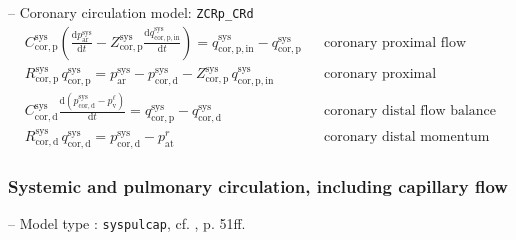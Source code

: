 \documentclass[a4paper,12pt]{report}
\begin{document}
-- Coronary circulation model: \verb"ZCRp_CRd"\\
\begin{equation}
\begin{aligned}
&C_{\mathrm{cor,p}}^{\mathrm{sys}} \left(\frac{\mathrm{d}p_{\mathrm{ar}}^{\mathrm{sys}}}{\mathrm{d}t}-Z_{\mathrm{cor,p}}^{\mathrm{sys}}\frac{\mathrm{d}q_{\mathrm{cor,p,in}}^{\mathrm{sys}}}{\mathrm{d}t}\right) = q_{\mathrm{cor,p,in}}^{\mathrm{sys}} - q_{\mathrm{cor,p}}^{\mathrm{sys}} && \text{coronary proximal flow balance}\\
&R_{\mathrm{cor,p}}^{\mathrm{sys}}\,q_{\mathrm{cor,p}}^{\mathrm{sys}}=p_{\mathrm{ar}}^{\mathrm{sys}}-p_{\mathrm{cor,d}}^{\mathrm{sys}} - Z_{\mathrm{cor,p}}^{\mathrm{sys}}\,q_{\mathrm{cor,p,in}}^{\mathrm{sys}} && \text{coronary proximal momentum}\nonumber\\
&C_{\mathrm{cor,d}}^{\mathrm{sys}} \frac{\mathrm{d}(p_{\mathrm{cor,d}}^{\mathrm{sys}}-p_{\mathrm{v}}^{\ell})}{\mathrm{d}t} = q_{\mathrm{cor,p}}^{\mathrm{sys}} - q_{\mathrm{cor,d}}^{\mathrm{sys}} && \text{coronary distal flow balance}\\
&R_{\mathrm{cor,d}}^{\mathrm{sys}}\,q_{\mathrm{cor,d}}^{\mathrm{sys}}=p_{\mathrm{cor,d}}^{\mathrm{sys}}-p_{\mathrm{at}}^{r} && \text{coronary distal momentum}
\end{aligned}
\end{equation}





\subsubsection{Systemic and pulmonary circulation, including capillary flow}

-- Model type : \verb"syspulcap", cf. \cite{hirschvogel2019disspub}, p. 51ff.\\
\end{document}
